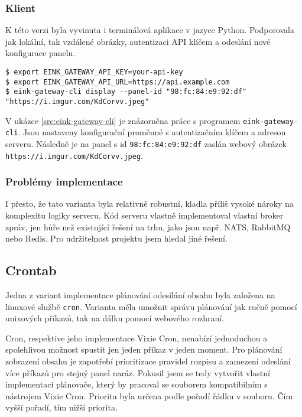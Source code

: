 \subsubsection{Klient}
K této verzi byla vyvinuta i terminálová aplikace v jazyce Python. Podporovala jak lokální, tak vzdálené obrázky, autentizaci API klíčem a odeslání nové konfigurace panelu.

\begin{lstlisting}[label=src:eink-gateway-cli,caption={Ukázka programu eink-gateway-cli pro odeslání obrázku na panel}]
$ export EINK_GATEWAY_API_KEY=your-api-key
$ export EINK_GATEWAY_API_URL=https://api.example.com
$ eink-gateway-cli display --panel-id "98:fc:84:e9:92:df" "https://i.imgur.com/KdCorvv.jpeg"
\end{lstlisting}

V ukázce \ref{src:eink-gateway-cli} je znázorněna práce s programem \lstinline|eink-gateway-cli|. Jsou nastaveny konfigurační proměnné s autentizačním klíčem a adresou serveru. Následně je na panel s id \verb|98:fc:84:e9:92:df| zaslán webový obrázek \verb|https://i.imgur.com/KdCorvv.jpeg|.

\subsubsection{Problémy implementace}
I přesto, že tato varianta byla relativně robustní, kladla příliš vysoké nároky na komplexitu logiky serveru. Kód serveru vlastně implementoval vlastní broker zpráv, jen hůře než existující řešení na trhu, jako jsou např. NATS\cite{NATSIo}, RabbitMQ\cite{RabbitMQOneBroker} nebo Redis\cite{RedisRealtimeData}. Pro udržitelnost projektu jsem hledal jiné řešení.

\subsection{Crontab}
Jedna z variant implementace plánování odesílání obsahu byla založena na linuxové službě \lstinline|cron|. Varianta měla umožnit správu plánování jak ručně pomocí unixových příkazů, tak na dálku pomocí webového rozhraní.

Cron, respektive jeho implementace Vixie Cron, nenabízí jednoduchou a spolehlivou možnost spustit jen jeden příkaz v jeden moment. Pro plánování zobrazení obsahu je zapotřebí prioritizace pravidel rozpisu a zamezení odeslání více příkazů pro stejný panel naráz. Pokusil jsem se tedy vytvořit vlastní implementaci plánovače, který by pracoval se souborem kompatibilním s nástrojem Vixie Cron. Priorita byla určena podle pořadí řádku v souboru. Čím vyšší pořadí, tím nižší priorita.

